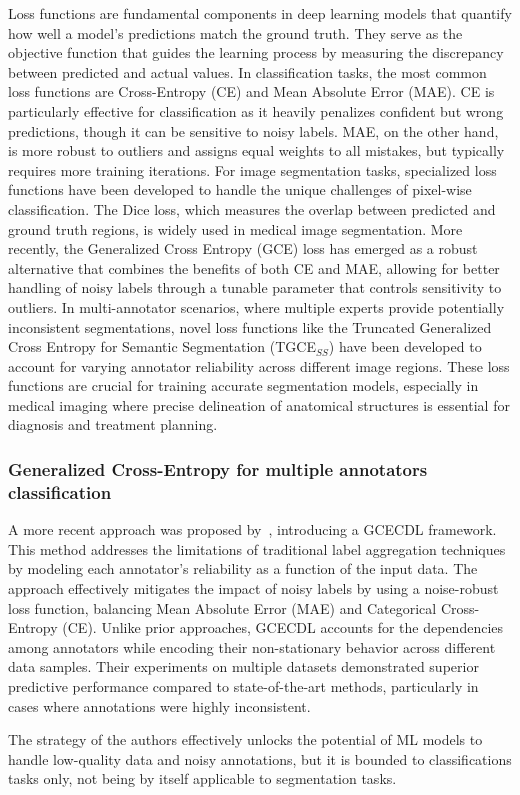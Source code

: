 Loss functions are fundamental components in deep learning models
that quantify how well a model's predictions match the ground truth.
They serve as the objective function that guides the learning process
by measuring the discrepancy between predicted and actual values. In
classification tasks, the most common loss functions are
Cross-Entropy (CE) and Mean Absolute Error (MAE). CE is particularly
effective for classification as it heavily penalizes confident but
wrong predictions, though it can be sensitive to noisy labels. MAE,
on the other hand, is more robust to outliers and assigns equal
weights to all mistakes, but typically requires more training
iterations. For image segmentation tasks, specialized loss functions
have been developed to handle the unique challenges of pixel-wise
classification. The Dice loss, which measures the overlap between
predicted and ground truth regions, is widely used in medical image
segmentation. More recently, the Generalized Cross Entropy (GCE) loss
has emerged as a robust alternative that combines the benefits of
both CE and MAE, allowing for better handling of noisy labels through
a tunable parameter that controls sensitivity to outliers. In
multi-annotator scenarios, where multiple experts provide potentially
inconsistent segmentations, novel loss functions like the Truncated
Generalized Cross Entropy for Semantic Segmentation (TGCE$_{SS}$)
have been developed to account for varying annotator reliability
across different image regions. These loss functions are crucial for
training accurate segmentation models, especially in medical imaging
where precise delineation of anatomical structures is essential for
diagnosis and treatment planning.

\subsubsection{Generalized Cross-Entropy for multiple annotators classification}

A more recent approach was proposed by~\cite{TrianaEtAl2023},
introducing a \gls{GCECDL} framework. This method addresses the limitations of
traditional label aggregation techniques by modeling each annotator's
reliability as a function of the input data. The approach effectively
mitigates the impact of noisy labels by using a noise-robust loss
function, balancing Mean Absolute Error (MAE) and Categorical
Cross-Entropy (CE). Unlike prior approaches, \gls{GCECDL} accounts for the
dependencies among annotators while encoding their non-stationary
behavior across different data samples. Their experiments on
multiple datasets demonstrated superior predictive performance
compared to state-of-the-art methods, particularly in cases where
annotations were highly inconsistent.

The strategy of the authors effectively unlocks the potential of
\gls{ML} models to handle low-quality data and noisy annotations, but
it is bounded to classifications tasks only, not being by itself applicable to
segmentation tasks.
